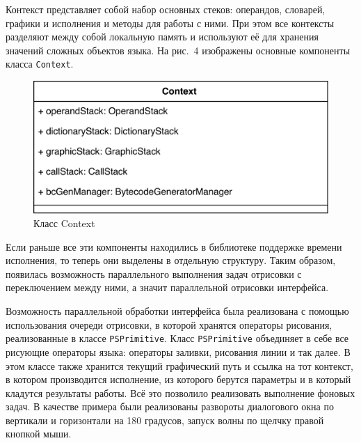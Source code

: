 \documentclass[14pt]{matmex-diploma}
\begin{document}
Контекст представляет собой набор основных стеков: операндов, словарей, графики и исполнения и методы для работы с ними. При этом все контексты разделяют между собой локальную память и используют её для хранения значений сложных объектов языка. На рис.~4 изображены основные компоненты класса \texttt{Context}.

\begin{figure}[h!]
\centering
	\includegraphics[width=0.8\linewidth]{Context.png}
	\caption{Класс Context}
\end{figure}


Если раньше все эти компоненты находились в библиотеке поддержке времени исполнения, то теперь они выделены в отдельную структуру. Таким образом, появилась возможность параллельного выполнения задач отрисовки с переключением между ними, а значит параллельной отрисовки интерфейса. 

Возможность параллельной обработки интерфейса была реализована с помощью использования очереди отрисовки, в которой хранятся операторы рисования, реализованные в классе \texttt{PSPrimitive}. Класс \texttt{PSPrimitive} объединяет в себе все рисующие операторы языка: операторы заливки, рисования линии и так далее. В этом классе также хранится текущий графический путь и ссылка на тот контекст, в котором производится исполнение, из которого берутся параметры и в который кладутся результаты работы.
Всё это позволило реализовать выполнение фоновых задач. В качестве примера были реализованы развороты диалогового окна по вертикали и горизонтали на 180 градусов, запуск волны по щелчку правой кнопкой мыши.

\end{document}
